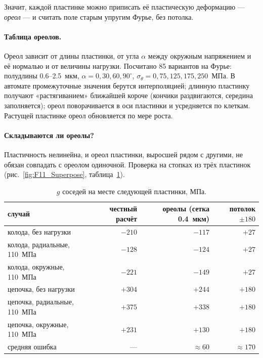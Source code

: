 Значит, каждой пластинке можно приписать её пластическую деформацию --- \emph{ореол} --- и
считать поле старым упругим Фурье, без потолка.


\paragraph{Таблица ореолов.} Ореол зависит от длины пластинки, от угла $\alpha$ между окружным
напряжением и её нормалью и от величины нагрузки. Посчитано 85 вариантов на Фурье:
полудлины 0.6--2.5~мкм, $\alpha=0,30,60,90^\circ$, $\sigma_\theta=0,75,125,175,250$~МПа.
В автомате промежуточные значения берутся интерполяцией; длинную пластинку получают
«растягиванием» ближайшей короче (кончики раздвигаются, середина заполняется); ореол поворачивается
в оси пластинки и усредняется по клеткам. Растущей пластинке ореол обновляется по мере роста.

\paragraph{Складываются ли ореолы?} Пластичность нелинейна, и ореол пластинки, выросшей рядом с
другими, не обязан совпадать с ореолом одиночной. Проверка на стопках из трёх пластинок
(рис.~\ref{fig:F11_Superpose}, таблица~\ref{tab:superpose}).


\begin{table}[htbp]\centering\small
\caption{$g$ соседей на месте следующей пластинки, МПа.}\label{tab:superpose}
\begin{tabular}{lrrr}\toprule
случай & честный расчёт & ореолы (сетка 0.4~мкм) & потолок $\pm180$\\\midrule
колода, без нагрузки & $-210$ & $-117$ & $+27$\\
колода, радиальные, 110~МПа & $-128$ & $-124$ & $+27$\\
колода, окружные, 110~МПа & $-221$ & $-149$ & $+27$\\
цепочка, без нагрузки & $+304$ & $+244$ & $+180$\\
цепочка, радиальные, 110~МПа & $+375$ & $+338$ & $+180$\\
цепочка, окружные, 110~МПа & $+231$ & $+130$ & $+180$\\\midrule
средняя ошибка & --- & $\approx60$ & $\approx170$\\\bottomrule
\end{tabular}
\end{table}


